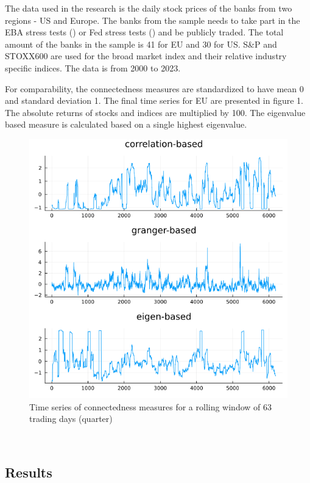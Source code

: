 \documentclass{article}
\begin{document}
The data used in the research is the daily stock prices of the banks from two regions - US and Europe. The banks from the sample needs to take part in the EBA stress tests (\citet{eba}) or Fed stress tests (\citet{fed}) and be publicly traded. The total amount of the banks in the sample is 41 for EU and 30 for US. S\&P and STOXX600 are used for the broad market index and their relative industry specific indices. The data is from 2000 to 2023.

For comparability, the connectedness measures are standardized to have mean 0 and standard deviation 1. The final time series for EU are presented in figure 1. The absolute returns of stocks and indices are multiplied by 100. The eigenvalue based measure is calculated based on a single highest eigenvalue. 

\begin{figure}[H]
  \caption{Time series of connectedness measures for a rolling window of 63 trading days (quarter)}
  \includegraphics[scale=0.5]{connectmeasures.png}
  \centering
\end{figure}

\

\subsection*{Results}
\end{document}
